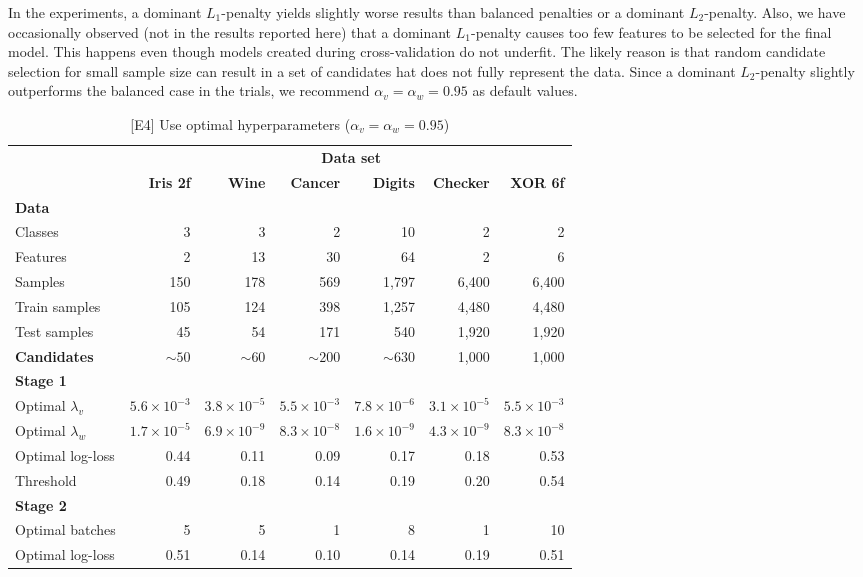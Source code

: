 %
\clearpage
%
In the experiments, a dominant $L_1$-penalty yields slightly worse results than balanced penalties or a dominant $L_2$-penalty.
Also, we have occasionally observed (not in the results reported here) that a dominant $L_1$-penalty causes too few features to be selected for the final model.
This happens even though models created during cross-validation do not underfit.
The likely reason is that random candidate selection for small sample size can result in a set of candidates hat does not fully represent the data.
Since a dominant $L_2$-penalty slightly outperforms the balanced case in the trials, we recommend $\alpha_v=\alpha_w=0.95$ as default values.\par
%
\begin{table}
\caption{[E4] Use optimal hyperparameters ($\alpha_v=\alpha_w=0.95$)}
\label{tab_e4}
%
\begin{center}
\small
\begin{tabular}{|lrrrrrr|}
\hline
&\multicolumn{6}{c|}{\textbf{\hrulefill\ Data set \hrulefill}}\\
&\textbf{Iris 2f}&\textbf{Wine}&\textbf{Cancer}&\textbf{Digits}&\textbf{Checker}&\textbf{XOR 6f}\\
\multicolumn{7}{|l|}{\textbf{Data}}\\
Classes&3&3&2&10&2&2\\
Features&2&13&30&64&2&6\\
Samples&150&178&569&1,797&6,400&6,400\\
Train samples&105&124&398&1,257&4,480&4,480\\
Test samples&45&54&171&540&1,920&1,920\\
\textbf{Candidates}&$\sim50$&$\sim60$&$\sim200$&$\sim630$&1,000&1,000\\
\multicolumn{7}{|l|}{\textbf{Stage 1}}\\
Optimal $\lambda_v$&$5.6\times10^{-3}$&$3.8\times10^{-5}$&$5.5\times10^{-3}$&$7.8\times10^{-6}$&$3.1\times10^{-5}$&$5.5\times10^{-3}$\\
Optimal $\lambda_w$&$1.7\times10^{-5}$&$6.9\times10^{-9}$&$8.3\times10^{-8}$&$1.6\times10^{-9}$&$4.3\times10^{-9}$&$8.3\times10^{-8}$\\
Optimal log-loss&0.44&0.11&0.09&0.17&0.18&0.53\\
Threshold&0.49&0.18&0.14&0.19&0.20&0.54\\
\multicolumn{7}{|l|}{\textbf{Stage 2}}\\
Optimal batches&5&5&1&8&1&10\\
Optimal log-loss&0.51&0.14&0.10&0.14&0.19&0.51\\

\end{tabular}
\end{center}
\end{table}
